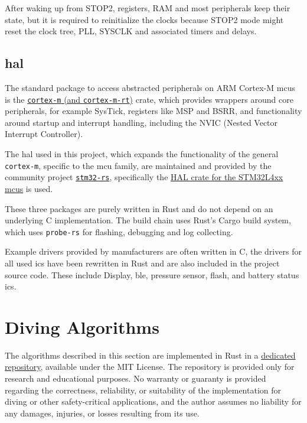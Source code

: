 After waking up from STOP2, registers, RAM and most peripherals keep their state, but it is required to reinitialize the clocks because STOP2 mode might reset the clock tree, PLL, SYSCLK and associated timers and delays. 

\subsection{\gls{hal}}\label{section:hal}
The standard package to access abstracted peripherals on ARM Cortex-M \gls{mcu}s is the \href{https://github.com/rust-embedded/cortex-m}{\lstinline{cortex-m} (and \lstinline{cortex-m-rt})} crate, which provides wrappers around core peripherals, for example SysTick, registers like MSP and BSRR, and functionality around startup and interrupt handling, including the NVIC (Nested Vector Interrupt Controller).

The \gls{hal} used in this project, which expands the functionality of the general \lstinline{cortex-m}, specific to the \gls{mcu} family, are maintained and provided by the community project \href{https://github.com/stm32-rs}{\lstinline{stm32-rs}}, specifically the \href{https://github.com/stm32-rs/stm32l4xx-hal}{HAL crate for the STM32L4xx \gls{mcu}s} is used.

These three packages are purely written in Rust and do not depend on an underlying C implementation. 
The build chain uses Rust's Cargo build system, which uses \lstinline{probe-rs} for flashing, debugging and log collecting.

Example drivers provided by manufacturers are often written in C, the drivers for all used \gls{ic}s have been rewritten in Rust and are also included in the project source code. 
These include Display, \gls{ble}, pressure sensor, flash, and battery status \gls{ic}s.

\section{Diving Algorithms}\label{section:algorithms}
The algorithms described in this section are implemented in Rust in a \hyperlink{https://github.com/SebastianThomas/STDC-thalmann}{dedicated repository}, available under the MIT License. 
The repository is provided only for research and educational purposes. 
No warranty or guaranty is provided regarding the correctness, reliability, or suitability of the implementation for diving or other safety-critical applications, and the author assumes no liability for any damages, injuries, or losses resulting from its use.

